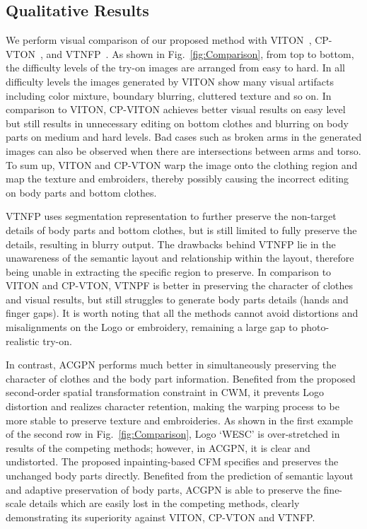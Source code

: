 \documentclass[10pt,twocolumn,letterpaper]{article}
\begin{document}
\subsection{Qualitative Results}
We perform visual comparison of our proposed method with VITON~\cite{DBLP:conf/cvpr/HanWWYD18}, CP-VTON~\cite{DBLP:conf/eccv/WangZLCLY18}, and VTNFP~\cite{Yu_2019_ICCV}. As shown in Fig.~\ref{fig:Comparison}, from top to bottom, the difficulty levels of the try-on images are arranged from easy to hard.
In all difficulty levels the images generated by VITON show many visual artifacts including color mixture, boundary blurring, cluttered texture and so on. In comparison to VITON, CP-VITON achieves better visual results on easy level but still results in unnecessary editing on bottom clothes and blurring on body parts on medium and hard levels.
Bad cases such as broken arms in the generated images can also be observed when there are intersections between arms and torso. To sum up, VITON and CP-VTON warp the image onto the clothing region and map the texture and embroiders, thereby possibly causing the incorrect editing on body parts and bottom clothes.

VTNFP uses segmentation representation to further preserve the non-target details of body parts and bottom clothes, but is still limited to fully preserve the details, resulting in blurry output. The drawbacks behind VTNFP lie in the unawareness of the semantic layout and relationship within the layout, therefore being unable in extracting the specific region to preserve. In comparison to VITON and CP-VTON, VTNPF is better in preserving the character of clothes and visual results, but still struggles to generate body parts details (\ie hands and finger gaps).
It is worth noting that all the methods cannot avoid distortions and misalignments on the Logo or embroidery, remaining a large gap to photo-realistic try-on.

In contrast, ACGPN performs much better in simultaneously preserving the character of clothes and the body part information. Benefited from the proposed second-order spatial transformation constraint in CWM, it prevents Logo distortion and realizes character retention, making the warping process to be more stable to preserve texture and embroideries.
As shown in the first example of the second row in Fig.~\ref{fig:Comparison}, Logo ‘WESC’ is over-stretched in results of the competing methods; however, in ACGPN, it is clear and undistorted.
The proposed inpainting-based CFM specifies and preserves the unchanged body parts directly. Benefited from the prediction of semantic layout and adaptive preservation of body parts, ACGPN is able to preserve the fine-scale details which are easily lost in the competing methods, clearly demonstrating its superiority against VITON, CP-VTON and VTNFP.
\end{document}
